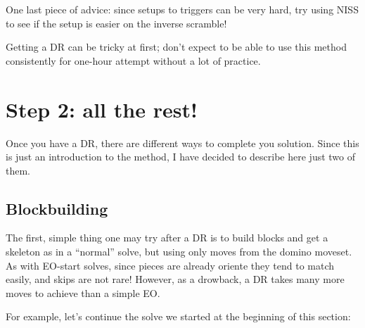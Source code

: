 \documentclass[11pt,a4paper]{book}
\begin{document}
One last piece of advice: since setups to triggers can be very hard, try using NISS to see if the setup is easier on the inverse scramble!

Getting a DR can be tricky at first; don't expect to be able to use this method consistently for one-hour attempt without a lot of practice.

\section{Step 2: all the rest!}

Once you have a DR, there are different ways to complete you solution. Since this is just an introduction to the method, I have decided to describe here just two of them.

\subsection{Blockbuilding}

The first, simple thing one may try after a DR is to build blocks and get a skeleton as in a ``normal'' solve, but using only moves from the domino moveset. As with EO-start solves, since pieces are already oriente they tend to match easily, and skips are not rare! However, as a drowback, a DR takes many more moves to achieve than a simple EO.

For example, let's continue the solve we started at the beginning of this section:
\end{document}
